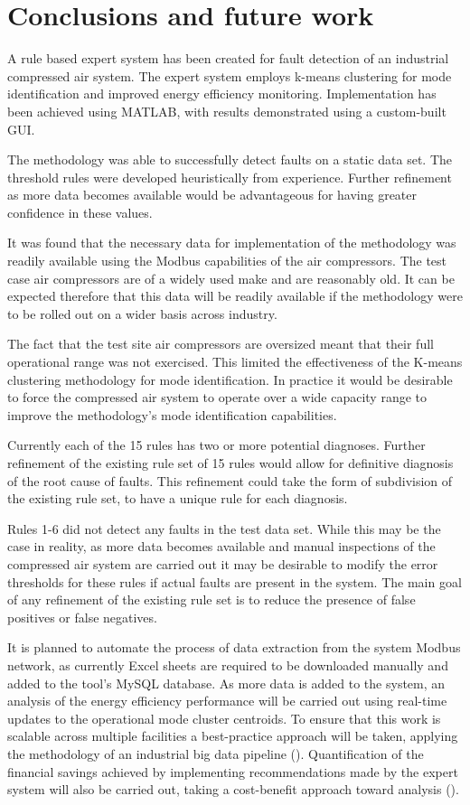 \section{Conclusions and future work}
\label{sec:conclusions}
A rule based expert system has been created for fault detection of an industrial compressed air system. The expert system employs k-means clustering for mode identification and improved energy efficiency monitoring. Implementation has been achieved using MATLAB, with results demonstrated using a custom-built GUI.

The methodology was able to successfully detect faults on a static data set. The threshold rules were developed heuristically from experience. Further refinement as more data becomes available would be advantageous for having greater confidence in these values.

It was found that the necessary data for implementation of the methodology was readily available using the Modbus capabilities of the air compressors. The test case air compressors are of a widely used make and are reasonably old. It can be expected therefore that this data will be readily available if the methodology were to be rolled out on a wider basis across industry. 

The fact that the test site air compressors are oversized meant that their full operational range was not exercised. This limited the effectiveness of the K-means clustering methodology for mode identification. In practice it would be desirable to force the compressed air system to operate over a wide capacity range to improve the methodology's mode identification capabilities.

Currently each of the 15 rules has two or more potential diagnoses. Further refinement of the existing rule set of 15 rules would allow for definitive diagnosis of the root cause of faults. This refinement could take the form of subdivision of the existing rule set, to have a unique rule for each diagnosis. 

Rules 1-6 did not detect any faults in the test data set. While this may be the case in reality, as more data becomes available and manual inspections of the compressed air system are carried out it may be desirable to modify the error thresholds for these rules if actual faults are present in the system. The main goal of any refinement of the existing rule set is to reduce the presence of false positives or false negatives.

It is planned to automate the process of data extraction from the system Modbus network, as currently Excel sheets are required to be downloaded manually and added to the tool's MySQL database. As more data is added to the system, an analysis of the energy efficiency performance will be carried out using real-time updates to the operational mode cluster centroids. To ensure that this work is scalable across multiple facilities a best-practice approach will be taken, applying the methodology of an industrial big data pipeline (\cite{ODonovan2015a}). Quantification of the financial savings achieved by implementing recommendations made by the expert system will also be carried out, taking a cost-benefit approach toward analysis (\cite{Walsh2013}).


